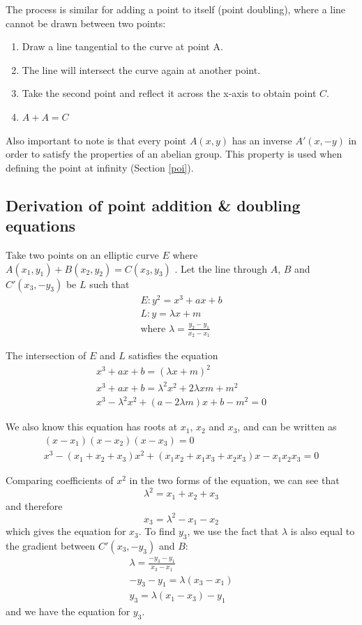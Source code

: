 \documentclass[a4paper]{article}
\begin{document}
The process is similar for adding a point to itself (point doubling), where a line cannot be drawn between two points:
\begin{enumerate}
    \item Draw a line tangential to the curve at point A.
    \item The line will intersect the curve again at another point.
    \item Take the second point and reflect it across the x-axis to obtain point $C$.
    \item $A + A = C$
\end{enumerate}

Also important to note is that every point $A(x, y)$ has an inverse $A'(x, -y)$ in order to satisfy the properties of an abelian group. This property is used when defining the point at infinity (Section \ref{poi}).

\subsection{Derivation of point addition \& doubling equations}

Take two points on an elliptic curve $E$ where $A(x_1, y_1) + B(x_2, y_2) = C(x_3, y_3)$ . Let the line through $A$, $B$ and $C'(x_3, -y_3)$ be $L$ such that
\begin{gather*}
    E: y^2 = x^3 + ax + b \\
    L: y = \lambda x + m \\
    \text{where } \lambda = \frac{y_2-y_1}{x_2-x_1}
\end{gather*}

The intersection of $E$ and $L$ satisfies the equation
\begin{align*}
    x^3 + ax + b = (\lambda x + m)^2 \\
    x^3 + ax + b = \lambda^2 x^2 + 2 \lambda x m + m^2 \\
    x^3 - \lambda^2 x^2 + (a - 2 \lambda m)x + b - m^2 = 0
\end{align*}

We also know this equation has roots at $x_1$, $x_2$ and $x_3$, and can be written as
\begin{align*}
    (x-x_1)(x-x_2)(x-x_3)=0 \\
    x^3 - (x_1 + x_2 + x_3)x^2 + (x_1x_2 + x_1x_3 + x_2x_3)x - x_1x_2x_3 = 0
\end{align*}

Comparing coefficients of $x^2$ in the two forms of the equation, we can see that \[\lambda^2 = x_1 + x_2 + x_3\] and therefore \[x_3 = \lambda^2 - x_1 - x_2\] which gives the equation for $x_3$. To find $y_3$, we use the fact that $\lambda$ is also equal to the gradient between $C'(x_3, -y_3)$ and $B$:
\begin{align*}
    \lambda = \frac{-y_3-y_1}{x_3-x_1} \\
    -y_3 - y_1 = \lambda(x_3-x_1) \\
    y_3 = \lambda(x_1-x_3)-y_1
\end{align*}
and we have the equation for $y_3$.\cite{proof}
\end{document}
